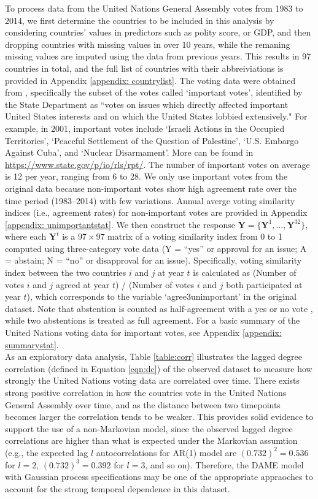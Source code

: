 \documentclass[a4paper]{article}
\begin{document}
To process data from the United Nations General Assembly votes from 1983 to 2014, we first determine the countries to be included in this analysis by considering countries' values in predictors such as polity score, or GDP, and then dropping countries with missing values in over 10 years, while the remaning missing values are imputed using the data from previous years. This results in 97 countries in total, and the full list of countries with their abbreiviations is provided in Appendix \ref{appendix: countrylist}. The voting data were obtained from \cite{12379_2016}, specifically the subset of the votes called `important votes', identified by the State Department as ``votes on issues which directly affected important United States interests and on which the United States lobbied extensively." For example, in 2001, important votes include `Israeli Actions in the Occupied Territories', `Peaceful Settlement of the Question of Palestine', `U.S. Embargo Against Cuba', and `Nuclear Disarmament'. More can be found in \url{https://www.state.gov/p/io/rls/rpt/}. The number of important votes on average is 12 per year, ranging from 6 to 28. We only use important votes from the original data because non-important votes show high agreement rate over the time period (1983--2014) with few variations. Annual averge voting similarity indices (i.e., agreement rates) for non-important votes are provided in Appendix \ref{appendix: unimportantstat}. We then construct the response $\mathbf{Y} = \{\mathbf{Y} ^1,\ldots,\mathbf{Y} ^{32}\}$, where each $\mathbf{Y} ^t$ is a $97\times 97$ matrix of a voting similarity index from 0 to 1 computed using three-category vote data (Y = “yes” or approval for an issue; A = abstain; N = “no” or disapproval for an issue). Specifically, voting similarity index between the two countries $i$ and $j$ at year $t$ is calculated as (Number of votes $i$ and $j$ agreed at year $t$) / (Number of votes $i$ and $j$ both participated at year $t$), which corresponds to the variable `agree3unimportant' in the original dataset. Note that abstention is counted as half-agreement with a yes or no vote \citep*{12379_2016}, while two abstentions is treated as full agreement. For a basic summary of the United Nations voting data for important votes, see Appendix \ref{appendix: summarystat}. \\ \newline
As an exploratory data analysis, Table \ref{table:corr} illustrates the lagged degree correlation (defined in Equation \ref{eqn:dc}) of the observed dataset to measure how strongly the United Nations voting data are correlated over time. There exists strong positive correlation in how the countries vote in the United Nations General Assembly over time, and as the distance between two timepoints becomes larger the correlation tends to be weaker. This provides solid evidence to support the use of a non-Markovian model, since the observed lagged degree correlations are higher than what is expected under the Markovian assumtion (e.g., the expected lag $l$ autocorrelations for AR(1) model are $(0.732)^2 = 0.536$ for $l=2$, $(0.732)^3 =0.392$ for $l=3$, and so on). Therefore, the DAME model with Gaussian process specifications may be one of the appropriate appraoches to account for the strong temporal dependence in this dataset.
\end{document}

